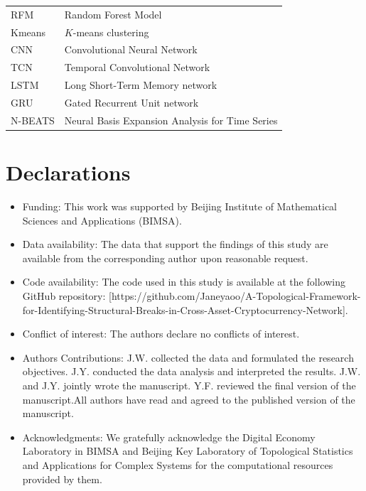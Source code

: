 \documentclass[11pt,reqno]{amsart}
\numberwithin{equation}{section} %
\begin{document}
\begin{table}[htbp]
\begin{tabular}{ll}
RFM                 & Random Forest Model \\
Kmeans              & $K$-means clustering \\
CNN                 & Convolutional Neural Network \\
TCN                 & Temporal Convolutional Network \\
LSTM                & Long Short-Term Memory network \\
GRU                 & Gated Recurrent Unit network \\
N-BEATS             & Neural Basis Expansion Analysis for Time Series \\
\bottomrule
\end{tabular}
\end{table}


\section*{Declarations}
\begin{itemize}
\item Funding: This work was supported by Beijing Institute of Mathematical Sciences and Applications (BIMSA).
\item Data availability: The data that support the findings of this study are available from the corresponding author upon reasonable request.
\item Code availability: The code used in this study is available at the following GitHub repository: [https://github.com/Janeyaoo/A-Topological-Framework-for-Identifying-Structural-Breaks-in-Cross-Asset-Cryptocurrency-Network].
\item Conflict of interest: The authors declare no conflicts of interest.
\item Authors Contributions: J.W. collected the data and formulated the research objectives. J.Y. conducted the data analysis and interpreted the results. J.W. and J.Y. jointly wrote the manuscript. Y.F. reviewed the final version of the manuscript.All authors have read and agreed to the published version of the manuscript.
\item Acknowledgments: We gratefully acknowledge the Digital Economy Laboratory in BIMSA and Beijing Key Laboratory of Topological Statistics and Applications for Complex Systems for the computational resources provided by them.
\end{itemize}
 

\end{document}
